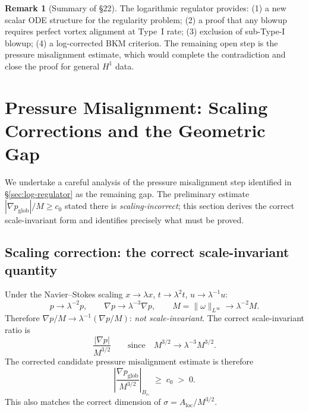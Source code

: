 \documentclass[11pt]{article}
\theoremstyle{definition}
\newtheorem{remark}[theorem]{Remark}
\theoremstyle{remark}
\begin{document}
\begin{remark}[Summary of §22]
  The logarithmic regulator provides: (1) a new scalar ODE structure for the
  regularity problem; (2) a proof that any blowup requires perfect vortex alignment
  at Type~I rate; (3) exclusion of sub-Type-I blowup; (4) a log-corrected BKM
  criterion.  The remaining open step is the pressure misalignment estimate, which
  would complete the contradiction and close the proof for general $H^1$ data.
\end{remark}

\section{Pressure Misalignment: Scaling Corrections and the Geometric Gap}
\label{sec:pressure-misalignment}

We undertake a careful analysis of the pressure misalignment step identified in
\S\ref{sec:log-regulator} as the remaining gap.  The preliminary estimate
$|\nabla p_{\mathrm{glob}}|/M \ge c_0$ stated there is \emph{scaling-incorrect};
this section derives the correct scale-invariant form and identifies precisely what
must be proved.

\subsection{Scaling correction: the correct scale-invariant quantity}

Under the Navier--Stokes scaling $x\to\lambda x$, $t\to\lambda^2 t$, $u\to\lambda^{-1}u$:
\[
  p \to \lambda^{-2}p, \qquad
  \nabla p \to \lambda^{-3}\nabla p, \qquad
  M = \|\omega\|_{L^\infty} \to \lambda^{-2}M.
\]
Therefore $\nabla p / M \to \lambda^{-1}(\nabla p/M)$: \emph{not scale-invariant}.
The correct scale-invariant ratio is
\[
  \boxed{\frac{|\nabla p|}{M^{3/2}}}
  \qquad \text{since} \quad M^{3/2}\to \lambda^{-3}M^{3/2}.
\]
The corrected candidate pressure misalignment estimate is therefore
\begin{equation}\label{eq:pressure-estimate-corrected}
  \left|\frac{\nabla p_{\mathrm{glob}}}{M^{3/2}}\right|_{B_{r_*}}
  \;\ge\; c_0 \;>\; 0.
\end{equation}
This also matches the correct dimension of $\sigma = A_{\mathrm{loc}}/M^{3/2}$.

\end{document}
